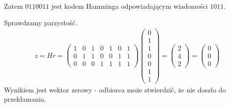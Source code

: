 Zatem $0110011$ jest kodem Hamminga odpowiadającym wiadomości $1011$.

Sprawdzamy parzystość.
\begin{align*}
    z=Hr=\begin{pmatrix}
             1 & 0 & 1 & 0 & 1 & 0 & 1 \\
             0 & 1 & 1 & 0 & 0 & 1 & 1 \\
             0 & 0 & 0 & 1 & 1 & 1 & 1
    \end{pmatrix}
    \begin{pmatrix}
        0 \\
        1 \\
        1 \\
        0 \\
        0 \\
        1 \\
        1
    \end{pmatrix}=
    \begin{pmatrix}
        2 \\
        4 \\
        2
    \end{pmatrix}=
    \begin{pmatrix}
        0 \\
        0 \\
        0
    \end{pmatrix}
\end{align*}
Wynikiem jest wektor zerowy - odbiorca może stwierdzić, że nie doszło do przekłamania.

